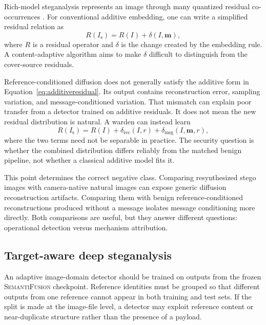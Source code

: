 \documentclass[pdflatex,sn-mathphys-num]{sn-jnl}
\newcommand{\method}{\textsc{SemantiFusion}}
\newcommand{\stego}{I_{\mathrm{s}}}
\newcommand{\msg}{\mathbf{m}}
\begin{document}
Rich-model steganalysis represents an image through many quantized residual co-occurrences \cite{fridrich2012rich}. For conventional additive embedding, one can write a simplified residual relation as
\begin{equation}
R(\stego)=R(I)+\delta(I,\msg),
\label{eq:additiveresidual}
\end{equation}
where $R$ is a residual operator and $\delta$ is the change created by the embedding rule. A content-adaptive algorithm aims to make $\delta$ difficult to distinguish from the cover-source residuals.

Reference-conditioned diffusion does not generally satisfy the additive form in Equation~\eqref{eq:additiveresidual}. Its output contains reconstruction error, sampling variation, and message-conditioned variation. That mismatch can explain poor transfer from a detector trained on additive residuals. It does not mean the new residual distribution is natural. A warden can instead learn
\begin{equation}
R(\stego)=R(I)+\delta_{\mathrm{rec}}(I,r)
+\delta_{\mathrm{msg}}(I,\msg,r),
\label{eq:decomposedresidual}
\end{equation}
where the two terms need not be separable in practice. The security question is whether the combined distribution differs reliably from the matched benign pipeline, not whether a classical additive model fits it.

This point determines the correct negative class. Comparing resynthesized stego images with camera-native natural images can expose generic diffusion reconstruction artifacts. Comparing them with benign reference-conditioned reconstructions produced without a message isolates message conditioning more directly. Both comparisons are useful, but they answer different questions: operational detection versus mechanism attribution.

\subsection{Target-aware deep steganalysis}

An adaptive image-domain detector should be trained on outputs from the frozen \method{} checkpoint. Reference identities must be grouped so that different outputs from one reference cannot appear in both training and test sets. If the split is made at the image-file level, a detector may exploit reference content or near-duplicate structure rather than the presence of a payload.
\end{document}
